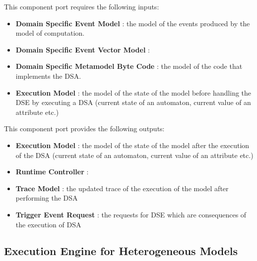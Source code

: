 \documentclass{gemoc} %
\begin{document}
This component port requires the following inputs:
\begin{itemize}
  \item \textbf{Domain Specific Event Model} :
the model of the events produced by the model of computation.
  \item \textbf{Domain Specific Event Vector Model} :
  \item \textbf{Domain Specific Metamodel Byte Code} :
the model of the code that implements the DSA.
  \item \textbf{Execution Model} :
the model of the state of the model before handling the DSE by executing a DSA (current state of an automaton, current value of an attribute etc.)
\end{itemize}

This component port provides the following outputs:
\begin{itemize}
  \item \textbf{Execution Model} :
the model of the state of the model after the execution of the DSA (current state of an automaton, current value of an attribute etc.)
  \item \textbf{Runtime Controller} :
  \item \textbf{Trace Model} :
the updated trace of the execution of the model after performing the DSA
  \item \textbf{Trigger Event Request} :
the requests for DSE which are consequences of the execution of DSA
\end{itemize}


\subsection{Execution Engine for Heterogeneous Models}
\end{document}

